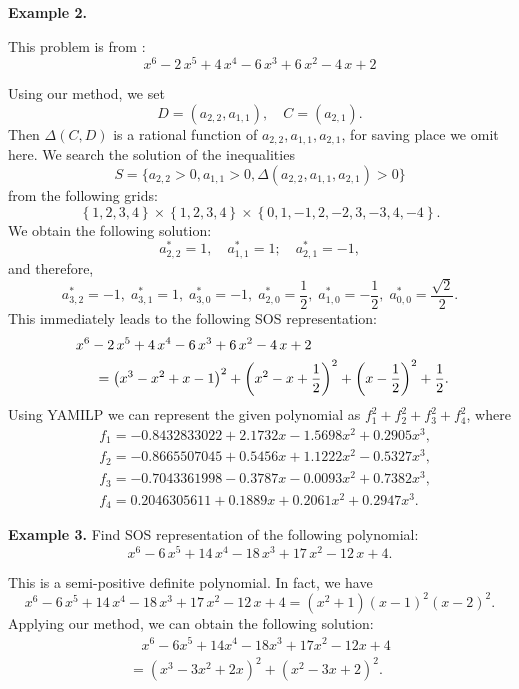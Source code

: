 \documentclass[runningheads]{llncs}
\newcommand{\Qo}{\Delta}
\begin{document}
{\bf Example 2. } 
{This problem is from \cite{Feng2020}:
$$
{x}^{6}-2\,{x}^{5}+4\,{x}^{4}-6\,{x}^{3}+6\,{x}^{2}-4\,x+2
$$

Using our method, we set
$$
D=\left(a_{2,2},a_{1,1}\right), \quad C=\left(a_{2,1}\right).
$$
Then ${\Qo}(C,D)$ is a rational function of $a_{2,2},a_{1,1},a_{2,1}$, for saving place we omit here. We search the solution of the inequalities 
$$
S=\{a_{2,2}>0, a_{1,1}>0, {\Qo}(a_{2,2},a_{1,1},a_{2,1})>0\}
$$
from the following grids:
$$
\left\{1,2,3,4\right\}\times \left\{1,2,3,4\right\}
\times \left\{0,1,-1,2,-2, 3,-3, 4,-4\right\}.
$$
We obtain the following solution:
$$
a_{2,2}^*=1, \quad a_{1,1}^*=1; \quad a_{2,1}^*=-1,
$$
and therefore,
$$
a_{3,2}^*=-1, \;
a_{3,1}^*=1, \;
a_{3,0}^*=-1, \;
a_{2,0}^*=\frac{1}{2}, \;
a_{1,0}^*=-\frac{1}{2}, \;
a_{0,0}^*=\frac{\sqrt{2}}{2}.
$$
This immediately leads to the following SOS representation: 
\begin{align}\label{eq-00008-0-20}
&
~~~~{x}^{6}-2\,{x}^{5}+4\,{x}^{4}-6\,{x}^{3}+6\,{x}^{2}-4\,x+2\notag\\
&~~~~~~~~= \left( {x}
^{3}-{x}^{2}+x-1 \right) ^{2}+ \left( {x}^{2}-x+\frac{1}{2} \right) ^{2}+
 \left( x-\frac{1}{2} \right) ^{2}+\frac{1}{2}.
&
\end{align}
Using YAMILP we can represent the given polynomial as $f_1^2+f_2^2+f_3^2+f_4^2$, where
\begin{align*}
&f_1 = -0.8432833022 + 2.1732  x - 1.5698  x^2+ 0.2905  x^3,\\
&f_2 = -0.8665507045 + 0.5456  x + 1.1222  x^2- 0.5327  x^3,\\
&f_3 = -0.7043361998 - 0.3787  x - 0.0093  x^2+ 0.7382  x^3,\\
&f_4 = 0.2046305611 + 0.1889  x + 0.2061  x^2+ 0.2947  x^3.
\end{align*}

{\bf Example 3. } Find SOS representation of the following polynomial:
$$
{x}^{6}-6\,{x}^{5}+14\,{x}^{4}-18\,{x}^{3}+17\,{x}^{2}-12\,x+4.
$$

This is a semi-positive definite polynomial. In fact, we have
 $${x}^{6}-6\,{x}^{5}+14\,{x}^{4}-18\,{x}^{3}+17\,{x}^{2}-12\,x+4=\left ({x}^{2}+1\right )\left (x-1\right )^{2}\left (x-2\right )^{2}.$$
Applying our method, we can obtain the following solution:
\begin{align}\label{008}
&
~~~~{x}^{6}-6{x}^{5}+14{x}^{4}-18{x}^{3}+17{x}^{2}-12x+4\nonumber\\
&=
\left ({x}^{3}-3{x}^{2}+2x\right )^{2}+\left ({x}^{2}-3x+2
\right )^{2}.
&
\end{align}%

}
\end{document}

